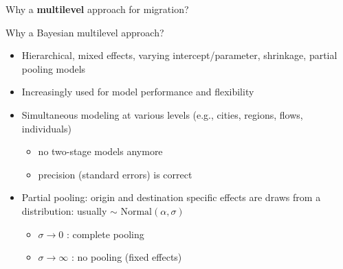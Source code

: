 \documentclass{beamer}
\begin{document}
\begin{frame}[fragile]{Why a \textbf{multilevel} approach for migration?}
\begin{description}
\begin{figure}
	\end{figure}
\end{description}
\end{frame}

\begin{frame}{Why a Bayesian multilevel approach?}
\begin{itemize}
	\item Hierarchical, mixed effects, varying intercept/parameter, shrinkage, partial pooling models\pause
	\item Increasingly used for model \alert{performance} and \alert{flexibility} \pause
    \item \alert{Simultaneous} modeling at various levels (e.g., cities, regions, flows, individuals) 
    \begin{itemize}
    	\item no two-stage models anymore 
    	\item precision (standard errors) is correct\pause
    \end{itemize}
	\item \alert{Partial pooling}: origin and destination specific effects are draws from a distribution: usually $\sim \text{ Normal}(\alpha, \sigma)$
	\begin{itemize}
		\item $\sigma \longrightarrow 0$ : complete pooling
		\item $\sigma \longrightarrow \infty$ : no pooling (fixed effects)
	\end{itemize}
\end{itemize}
\end{frame}
\end{document}
